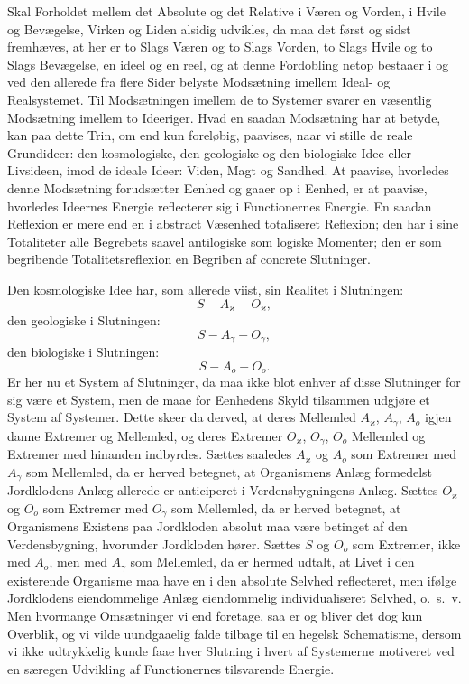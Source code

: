 \documentclass[12pt]{book}
\newcommand{\opage}[1]{\marginnote{\footnotesize\textit{[#1]}}}
\begin{document}
Skal Forholdet mellem det Absolute og det Relative i
\opage{449} Væren og Vorden, i Hvile og Bevægelse, Virken og Liden alsidig udvikles, da maa det først og sidst
fremhæves, at her er to Slags Væren og to Slags Vorden, to Slags Hvile og to Slags Bevægelse, en ideel
og en reel, og at denne Fordobling netop bestaaer i og ved den allerede fra flere Sider belyste
Modsætning imellem Ideal- og Realsystemet. Til Modsætningen imellem de to Systemer svarer en væsentlig
Modsætning imellem to Ideeriger. Hvad en saadan Modsætning har at betyde, kan paa dette Trin, om end
kun foreløbig, paavises, naar vi stille de reale Grundideer: den kosmologiske, den geologiske og den
biologiske Idee eller Livsideen, imod de ideale Ideer: Viden, Magt og Sandhed. At paavise, hvorledes
denne Modsætning forudsætter Eenhed og gaaer op i Eenhed, er at paavise, hvorledes Ideernes Energie
reflecterer sig i Functionernes Energie. En saadan Reflexion er mere end en i abstract Væsenhed
totaliseret Reflexion; den har i sine Totaliteter alle Begrebets saavel antilogiske som logiske
Momenter; den er som begribende Totalitetsreflexion en Begriben af concrete Slutninger.

Den kosmologiske Idee har, som allerede viist, sin Realitet i Slutningen:
\[ S - A_{\varkappa} - O_{\varkappa}, \]
den geologiske i Slutningen:
\[ S - A_\gamma - O_\gamma, \]
den biologiske i Slutningen:
\[ S - A_o - O_o. \]
Er her nu et System af Slutninger, da maa ikke blot enhver af disse Slutninger for sig være et System,
men de maae for Eenhedens Skyld tilsammen udgjøre et System af Systemer. Dette skeer da derved, at
deres Mellemled $A_{\varkappa}$, $A_\gamma$, $A_o$ igjen danne Extremer og Mellemled, og deres
Extremer $O_{\varkappa}$, $O_\gamma$, $O_o$ Mellemled og Extremer med hinanden indbyrdes. Sættes
saaledes $A_{\varkappa}$ og $A_o$ som Extremer med $A_\gamma$ som Mellemled, da er herved betegnet, at
Organismens
\opage{450} Anlæg formedelst Jordklodens Anlæg allerede er anticiperet i Verdensbygningens Anlæg. Sættes
$O_{\varkappa}$ og $O_o$ som Extremer med $O_\gamma$ som Mellemled, da er herved betegnet, at
Organismens Existens paa Jordkloden absolut maa være betinget af den Verdensbygning, hvorunder
Jordkloden hører. Sættes $S$ og $O_o$ som Extremer, ikke med $A_o$, men med $A_\gamma$ som Mellemled,
da er hermed udtalt, at Livet i den existerende Organisme maa have en i den absolute Selvhed
reflecteret, men ifølge Jordklodens eiendommelige Anlæg eiendommelig individualiseret Selvhed, o.\
s.\ v. Men hvormange Omsætninger vi end foretage, saa er og bliver det dog kun Overblik, og vi vilde
uundgaaelig falde tilbage til en hegelsk Schematisme, dersom vi ikke udtrykkelig kunde faae hver
Slutning i hvert af Systemerne motiveret ved en særegen Udvikling af Functionernes tilsvarende Energie.
\end{document}
